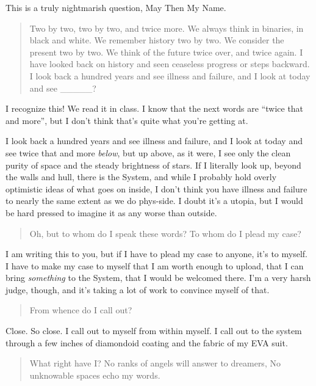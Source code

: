 This is a truly nightmarish question, May Then My Name.

\begin{quote}
Two by two, two by two, and twice more. We always think in binaries, in black and white. We remember history two by two. We consider the present two by two. We think of the future twice over, and twice again. I have looked back on history and seen ceaseless progress or steps backward. I look back a hundred years and see illness and failure, and I look at today and see \_\_\_\_\_?
\end{quote}

I recognize this! We read it in class. I know that the next words are ``twice that and more'', but I don't think that's quite what you're getting at.

I look back a hundred years and see illness and failure, and I look at today and see twice that and more \emph{below}, but up above, as it were, I see only the clean purity of space and the steady brightness of stars. If I literally look up, beyond the walls and hull, there is the System, and while I probably hold overly optimistic ideas of what goes on inside, I don't think you have illness and failure to nearly the same extent as we do phys-side. I doubt it's a utopia, but I would be hard pressed to imagine it as any worse than outside.

\begin{quote}
Oh, but to whom do I speak these words? To whom do I plead my case?
\end{quote}

I am writing this to you, but if I have to plead my case to anyone, it's to myself. I have to make my case to myself that I am worth enough to upload, that I can bring \emph{something} to the System, that I would be welcomed there. I'm a very harsh judge, though, and it's taking a lot of work to convince myself of that.

\begin{quote}
From whence do I call out?
\end{quote}

Close. So close. I call out to myself from within myself. I call out to the system through a few inches of diamondoid coating and the fabric of my EVA suit.

\begin{quote}
What right have I? No ranks of angels will answer to dreamers, No unknowable spaces echo my words.
\end{quote}

